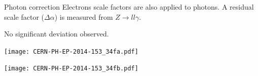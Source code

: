 \begin{frame}{Photon correction}
Electrons scale factors are also applied to photons. 
A residual scale factor ($\Delta\alpha$) is measured from $Z\rightarrow ll\gamma$.

No significant deviation observed.
\newline
  \begin{minipage}{0.49\linewidth}
    \texttt{[image: CERN-PH-EP-2014-153\_34fa.pdf]}
  \end{minipage}
  \hfill
  \begin{minipage}{0.49\linewidth}
    \texttt{[image: CERN-PH-EP-2014-153\_34fb.pdf]}
  \end{minipage}
\end{frame}

